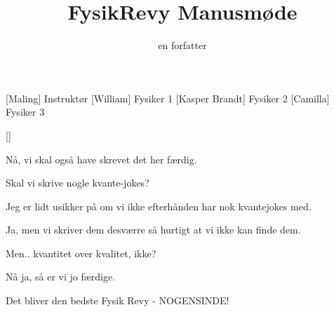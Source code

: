 \documentclass[a4paper,11pt]{article}
\title{FysikRevy Manusmøde}
\author{en forfatter}
\begin{document}
\maketitle

\begin{roles}
[Maling] Instruktør
[William] Fysiker 1
[Kasper Brandt] Fysiker 2
[Camilla] Fysiker 3
\end{roles}

\begin{props}
[]
\end{props}

\begin{sketch}

 Nå, vi skal også have skrevet det her færdig.

 Skal vi skrive nogle kvante-jokes?

 Jeg er lidt usikker på om vi ikke efterhånden har nok kvantejokes med.

 Ja, men vi skriver dem desværre så hurtigt at vi ikke kan finde dem.

 Men.. kvantitet over kvalitet, ikke?

 Nå ja, så er vi jo færdige.


 Det bliver den bedste Fysik Revy - NOGENSINDE!
\end{sketch}
\end{document}
